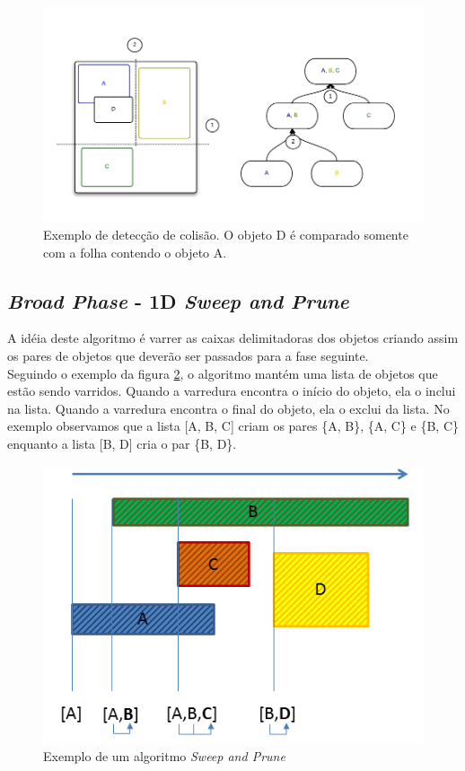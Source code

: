 \begin{figure}[H]
  \includegraphics[scale=0.4]{AABBTree1.png}
  \caption{Exemplo de detecção de colisão. O objeto D é comparado somente com a folha contendo o objeto A.}
  \label{aabbTree}
\end{figure}

\subsection{\textit{Broad Phase} - 1D \textit{Sweep and Prune}}

A idéia deste algoritmo é varrer as caixas delimitadoras dos objetos criando assim os pares de objetos que deverão ser passados para a fase seguinte. \\

Seguindo o exemplo da figura \ref{sweep}, o algoritmo mantém uma lista de objetos que estão sendo varridos. Quando a varredura encontra o início do objeto, ela o inclui na lista. 
Quando a varredura encontra o final do objeto, ela o exclui da lista. No exemplo observamos que a lista [A, B, C] criam os pares \{A, B\}, \{A, C\} e \{B, C\} 
enquanto a lista [B, D] cria o par \{B, D\}. \\

\begin{figure}[!htbp]
  \centering
  \includegraphics[scale=0.7]{sp.png}
  \caption{Exemplo de um algoritmo \textit{Sweep and Prune}}
  \label{sweep}
\end{figure}

